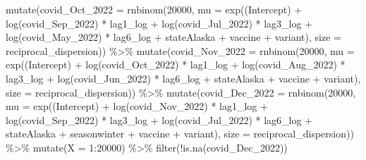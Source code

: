 \documentclass[
]{book}
\newenvironment{Shaded}{\begin{snugshade}}{\end{snugshade}}
\newcommand{\AttributeTok}[1]{\textcolor[rgb]{0.77,0.63,0.00}{#1}}
\newcommand{\DecValTok}[1]{\textcolor[rgb]{0.00,0.00,0.81}{#1}}
\newcommand{\FunctionTok}[1]{\textcolor[rgb]{0.00,0.00,0.00}{#1}}
\newcommand{\NormalTok}[1]{#1}
\newcommand{\SpecialCharTok}[1]{\textcolor[rgb]{0.00,0.00,0.00}{#1}}
\newcommand{\StringTok}[1]{\textcolor[rgb]{0.31,0.60,0.02}{#1}}
\begin{document}
\begin{Shaded}
\begin{Highlighting}[]
  \FunctionTok{mutate}\NormalTok{(}\AttributeTok{covid\_Oct\_2022 =} \FunctionTok{rnbinom}\NormalTok{(}\DecValTok{20000}\NormalTok{, }\AttributeTok{mu =} \FunctionTok{exp}\NormalTok{(}\StringTok{\textasciigrave{}}\AttributeTok{(Intercept)}\StringTok{\textasciigrave{}} \SpecialCharTok{+} \FunctionTok{log}\NormalTok{(covid\_Sep\_2022) }\SpecialCharTok{*}\NormalTok{ lag1\_log }\SpecialCharTok{+} \FunctionTok{log}\NormalTok{(covid\_Jul\_2022) }\SpecialCharTok{*}\NormalTok{ lag3\_log }\SpecialCharTok{+} \FunctionTok{log}\NormalTok{(covid\_May\_2022) }\SpecialCharTok{*}\NormalTok{ lag6\_log }\SpecialCharTok{+}\NormalTok{ stateAlaska }\SpecialCharTok{+}\NormalTok{ vaccine }\SpecialCharTok{+}\NormalTok{ variant), }\AttributeTok{size =}\NormalTok{ reciprocal\_dispersion))  }\SpecialCharTok{\%\textgreater{}\%}
  \FunctionTok{mutate}\NormalTok{(}\AttributeTok{covid\_Nov\_2022 =} \FunctionTok{rnbinom}\NormalTok{(}\DecValTok{20000}\NormalTok{, }\AttributeTok{mu =} \FunctionTok{exp}\NormalTok{(}\StringTok{\textasciigrave{}}\AttributeTok{(Intercept)}\StringTok{\textasciigrave{}} \SpecialCharTok{+} \FunctionTok{log}\NormalTok{(covid\_Oct\_2022) }\SpecialCharTok{*}\NormalTok{ lag1\_log }\SpecialCharTok{+} \FunctionTok{log}\NormalTok{(covid\_Aug\_2022) }\SpecialCharTok{*}\NormalTok{ lag3\_log }\SpecialCharTok{+} \FunctionTok{log}\NormalTok{(covid\_Jun\_2022) }\SpecialCharTok{*}\NormalTok{ lag6\_log }\SpecialCharTok{+}\NormalTok{ stateAlaska }\SpecialCharTok{+}\NormalTok{ vaccine }\SpecialCharTok{+}\NormalTok{ variant), }\AttributeTok{size =}\NormalTok{ reciprocal\_dispersion))  }\SpecialCharTok{\%\textgreater{}\%}
  \FunctionTok{mutate}\NormalTok{(}\AttributeTok{covid\_Dec\_2022 =} \FunctionTok{rnbinom}\NormalTok{(}\DecValTok{20000}\NormalTok{, }\AttributeTok{mu =} \FunctionTok{exp}\NormalTok{(}\StringTok{\textasciigrave{}}\AttributeTok{(Intercept)}\StringTok{\textasciigrave{}} \SpecialCharTok{+} \FunctionTok{log}\NormalTok{(covid\_Nov\_2022) }\SpecialCharTok{*}\NormalTok{ lag1\_log }\SpecialCharTok{+} \FunctionTok{log}\NormalTok{(covid\_Sep\_2022) }\SpecialCharTok{*}\NormalTok{ lag3\_log }\SpecialCharTok{+} \FunctionTok{log}\NormalTok{(covid\_Jul\_2022) }\SpecialCharTok{*}\NormalTok{ lag6\_log }\SpecialCharTok{+}\NormalTok{ stateAlaska }\SpecialCharTok{+}\NormalTok{ seasonwinter }\SpecialCharTok{+}\NormalTok{ vaccine }\SpecialCharTok{+}\NormalTok{ variant), }\AttributeTok{size =}\NormalTok{ reciprocal\_dispersion)) }\SpecialCharTok{\%\textgreater{}\%}
  \FunctionTok{mutate}\NormalTok{(}\AttributeTok{X =} \DecValTok{1}\SpecialCharTok{:}\DecValTok{20000}\NormalTok{) }\SpecialCharTok{\%\textgreater{}\%}
  \FunctionTok{filter}\NormalTok{(}\SpecialCharTok{!}\FunctionTok{is.na}\NormalTok{(covid\_Dec\_2022))}
\end{Highlighting}
\end{Shaded}
\end{document}
